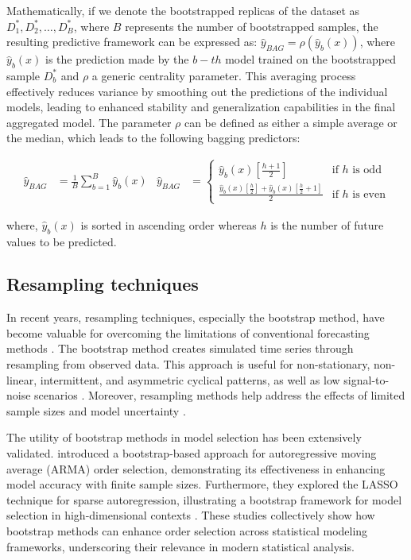 \documentclass[a4paper,fleqn,3p,11pt,authoryear]{cas-sc}
\begin{document}
Mathematically, if we denote the bootstrapped replicas of the dataset as $D^*_1, D^*_2, \ldots, D^*_B$, where $B$  represents the number of bootstrapped samples, the resulting predictive framework can be expressed as:  $\hat{y}_{\textit{BAG}} = \rho( \hat{y}_{b}(x) )$, where $\hat{y}_{b}(x)$ is the prediction made by the $b-th$ model trained on the bootstrapped sample $ D^*_b $  and $\rho$ a generic centrality parameter. 
This averaging process effectively reduces variance by smoothing out the predictions of the individual models, leading to enhanced stability and generalization capabilities in the final aggregated model.  The parameter $\rho$ can be defined as either a simple average or the median, which leads to the following bagging predictors:

\begin{align}
	\hat{y}_{\textit{BAG}} &= \frac{1}{B} \sum_{b=1}^{B} \hat{y}_{b}(x) &
	\hat{y}_{\textit{BAG}} &=
	\begin{cases}
		\hat{y}_{b}(x)\left[\frac{h+1}{2}\right] & \text{if } h \text{ is odd} \\
		\frac{\hat{y}_{b}(x)\left[\frac{h}{2}\right] + \hat{y}_{b}(x)\left[\frac{h}{2} + 1\right]}{2} & \text{if } h \text{ is even}
	\end{cases}
\end{align}

\noindent where, $\hat{y}_{b}(x)$  is  sorted in ascending order whereas $h$ is the number of future values to be predicted.

\subsection{Resampling techniques} \label{Subsec:resampling}

In recent years, resampling techniques, especially the bootstrap method, have become valuable for overcoming the limitations of conventional forecasting methods \citep{hasni2019spare}. The bootstrap method creates simulated time series through resampling from observed data. This approach is useful for non-stationary, non-linear, intermittent, and asymmetric cyclical patterns, as well as low signal-to-noise scenarios \citep{feliu2024enhancing, kreiss2012bootstrap}. Moreover, resampling methods help address the effects of limited sample sizes \citep{davison1997bootstrap}  and model uncertainty \citep{sarris2020exploiting}. 

The utility of bootstrap methods in model selection has been extensively validated. \citet{fenga2011bootstrap} introduced a bootstrap-based approach for autoregressive moving average (ARMA) order selection, demonstrating its effectiveness in enhancing model accuracy with finite sample sizes. Furthermore, they explored the LASSO technique for sparse autoregression, illustrating a bootstrap framework for model selection in high-dimensional contexts \citep{fenga2017lasso}. These studies collectively show how bootstrap methods can enhance order selection across statistical modeling frameworks, underscoring their relevance in modern statistical analysis.
\end{document}

